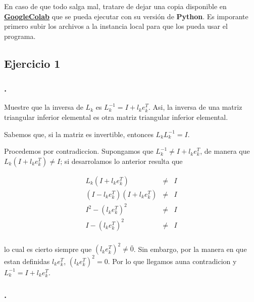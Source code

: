 \documentclass[11pt]{article}
\begin{document}
En caso de que todo salga mal, tratare de dejar una copia disponible en
\href{https://colab.research.google.com/gist/BenchHPZ/813abd96c1dac91b038905ac85cc425c/tarea3.ipynb}{\bf GoogleColab} que se pueda ejecutar con su versión de
\textbf{Python}. Es imporante primero subir los archivos a la instancia local para que los pueda usar el programa.













\newpage
    \hypertarget{ejercicio-1}{%
\subsection{Ejercicio 1}\label{ejercicio-1}}

    \hypertarget{section}{%
\subsubsection{.}\label{section}}

Muestre que la inversa de \(L_k\) es \(L^{-1}_k = I + l_ke_k^T\). Asi,
la inversa de una matriz triangular inferior elemental es otra matriz
triangular inferior elemental.

    Sabemos que, si la matriz es invertible, entonces \(L_kL_k^{-1} = I\).

Procedemos por contradiccion. Supongamos que
\(L^{-1}_k \neq I + l_ke_k^T\), de manera que
\(L_k(I + l_ke_k^T) \neq I\); si desarrolamos lo anterior resulta que

\begin{eqnarray*}
    L_k(I + l_ke_k^T) &\neq& I \\
    (I - l_ke_k^T)(I + l_ke_k^T) &\neq& I \\
    I^2 - (l_ke_k^T)^2 &\neq& I \\
    I - (l_ke_k^T)^2 &\neq& I \\ 
\end{eqnarray*}

lo cual es cierto siempre que \((l_ke_k^T)^2 \neq \bar{0}\). Sin
embargo, por la manera en que estan definidas \(l_ke_k^T\),
\((l_ke_k^T)^2 = 0\). Por lo que llegamos auna contradicion y
\(L^{-1}_k = I + l_ke_k^T\).

    \hypertarget{section}{%
\subsubsection{.}\label{section}}
\end{document}
